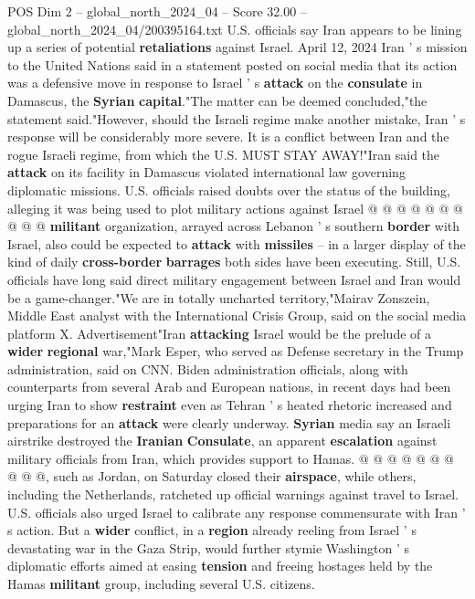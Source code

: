 \begin{textsample}{POS Dim 2 – global\_north\_2024\_04 – Score 32.00 – global\_north\_2024\_04/200395164.txt}
U.S. officials say Iran appears to be lining up a series of potential \textbf{retaliations} against Israel.
April 12, 2024 Iran ' s mission to the United Nations said in a statement posted on social media that its action was a defensive move in response to Israel ' s \textbf{attack} on the \textbf{consulate} in Damascus, the \textbf{Syrian} \textbf{capital}."The matter can be deemed concluded,"the statement said."However, should the Israeli regime make another mistake, Iran ' s response will be considerably more severe.
It is a conflict between Iran and the rogue Israeli regime, from which the U.S.
MUST STAY AWAY!"Iran said the \textbf{attack} on its facility in Damascus violated international law governing diplomatic missions.
U.S. officials raised doubts over the status of the building, alleging it was being used to plot military actions against Israel @ @ @ @ @ @ @ @ @ @ \textbf{militant} organization, arrayed across Lebanon ' s southern \textbf{border} with Israel, also could be expected to \textbf{attack} with \textbf{missiles} -- in a larger display of the kind of daily \textbf{cross-border} \textbf{barrages} both sides have been executing.
Still, U.S. officials have long said direct military engagement between Israel and Iran would be a game-changer."We are in totally uncharted territory,"Mairav Zonszein, Middle East analyst with the International Crisis Group, said on the social media platform X.
Advertisement"Iran \textbf{attacking} Israel would be the prelude of a \textbf{wider} \textbf{regional} war,"Mark Esper, who served as Defense secretary in the Trump administration, said on CNN.
Biden administration officials, along with counterparts from several Arab and European nations, in recent days had been urging Iran to show \textbf{restraint} even as Tehran ' s heated rhetoric increased and preparations for an \textbf{attack} were clearly underway. \textbf{Syrian} media say an Israeli airstrike destroyed the \textbf{Iranian} \textbf{Consulate}, an apparent \textbf{escalation} against military officials from Iran, which provides support to Hamas. @ @ @ @ @ @ @ @ @ @, such as Jordan, on Saturday closed their \textbf{airspace}, while others, including the Netherlands, ratcheted up official warnings against travel to Israel.
U.S. officials also urged Israel to calibrate any response commensurate with Iran ' s action.
But a \textbf{wider} conflict, in a \textbf{region} already reeling from Israel ' s devastating war in the Gaza Strip, would further stymie Washington ' s diplomatic efforts aimed at easing \textbf{tension} and freeing hostages held by the Hamas \textbf{militant} group, including several U.S. citizens.

\end{textsample}
